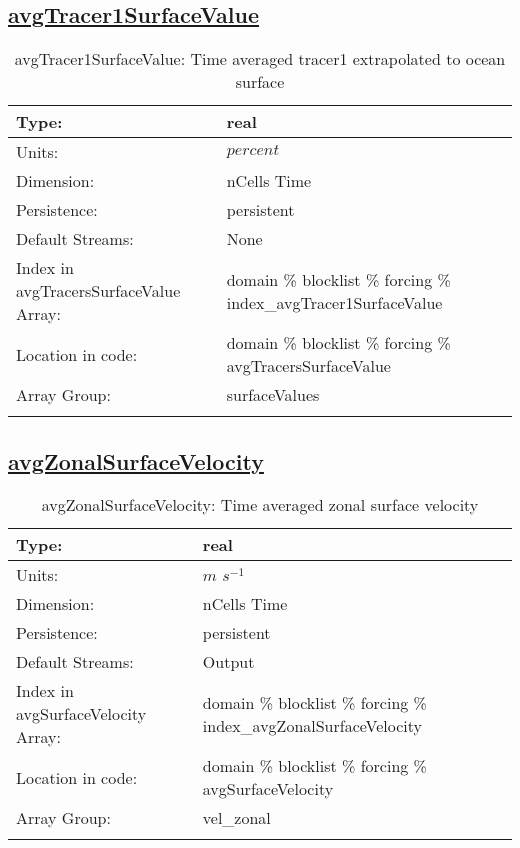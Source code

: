 \subsection[avgTracer1SurfaceValue]{\hyperref[sec:var_tab_forcing]{avgTracer1SurfaceValue}}
\label{subsec:var_sec_forcing_avgTracer1SurfaceValue}
\begin{center}
\begin{longtable}{| p{2.0in} | p{4.0in} |}
        \hline 
        Type: & real \\
        \hline 
        Units: & $percent$ \\
        \hline 
        Dimension: & nCells Time \\
        \hline 
        Persistence: & persistent \\
        \hline 
		 Default Streams: & None \\
        \hline 
		 Index in avgTracersSurfaceValue Array: & domain \% blocklist \% forcing \% index\_avgTracer1SurfaceValue \\
		 \hline 
		 Location in code: & domain \% blocklist \% forcing \% avgTracersSurfaceValue \\
		 \hline 
		 Array Group: & surfaceValues \\
		 \hline 
    \caption{avgTracer1SurfaceValue: Time averaged tracer1 extrapolated to ocean surface}
\end{longtable}
\end{center}
\subsection[avgZonalSurfaceVelocity]{\hyperref[sec:var_tab_forcing]{avgZonalSurfaceVelocity}}
\label{subsec:var_sec_forcing_avgZonalSurfaceVelocity}
\begin{center}
\begin{longtable}{| p{2.0in} | p{4.0in} |}
        \hline 
        Type: & real \\
        \hline 
        Units: & $m$ $s^{-1}$ \\
        \hline 
        Dimension: & nCells Time \\
        \hline 
        Persistence: & persistent \\
        \hline 
		 Default Streams: & Output  \\
        \hline 
		 Index in avgSurfaceVelocity Array: & domain \% blocklist \% forcing \% index\_avgZonalSurfaceVelocity \\
		 \hline 
		 Location in code: & domain \% blocklist \% forcing \% avgSurfaceVelocity \\
		 \hline 
		 Array Group: & vel\_zonal \\
		 \hline 
    \caption{avgZonalSurfaceVelocity: Time averaged zonal surface velocity}
\end{longtable}
\end{center}
